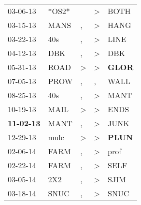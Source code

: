\begin{supertabular}{p{0.07\textwidth}p{0.06\textwidth}p{0.02\textwidth}p{0.02\textwidth}p{0.06\textwidth}}
          03-06-13\textsuperscript{} &                           *OS2* &                  &     \textgreater &           BOTH\textsuperscript{} \\
          03-15-13\textsuperscript{} &          MANS\textsuperscript{} &                , &     \textgreater &           HANG\textsuperscript{} \\
          03-22-13\textsuperscript{} &           40s\textsuperscript{} &                , &     \textgreater &           LINE\textsuperscript{} \\
          04-12-13\textsuperscript{} &           DBK\textsuperscript{} &                , &     \textgreater &            DBK\textsuperscript{} \\
          05-31-13\textsuperscript{} &          ROAD\textsuperscript{} &     \textgreater &     \textgreater &  \textbf{GLOR\textsuperscript{}} \\
          07-05-13\textsuperscript{} &          PROW\textsuperscript{} &                , &                , &           WALL\textsuperscript{} \\
          08-25-13\textsuperscript{} &           40s\textsuperscript{} &                , &     \textgreater &           MANT\textsuperscript{} \\
          10-19-13\textsuperscript{} &          MAIL\textsuperscript{} &     \textgreater &     \textgreater &           ENDS\textsuperscript{} \\
 \textbf{11-02-13\textsuperscript{}} &          MANT\textsuperscript{} &                , &     \textgreater &           JUNK\textsuperscript{} \\
          12-29-13\textsuperscript{} &          mulc\textsuperscript{} &     \textgreater &     \textgreater &  \textbf{PLUN\textsuperscript{}} \\
          02-06-14\textsuperscript{} &          FARM\textsuperscript{} &                , &     \textgreater &           prof\textsuperscript{} \\
          02-22-14\textsuperscript{} &          FARM\textsuperscript{} &                , &     \textgreater &           SELF\textsuperscript{} \\
          03-05-14\textsuperscript{} &           2X2\textsuperscript{} &                , &     \textgreater &           SJIM\textsuperscript{} \\
          03-18-14\textsuperscript{} &          SNUC\textsuperscript{} &                , &     \textgreater &           SNUC\textsuperscript{} \\

\end{supertabular}
